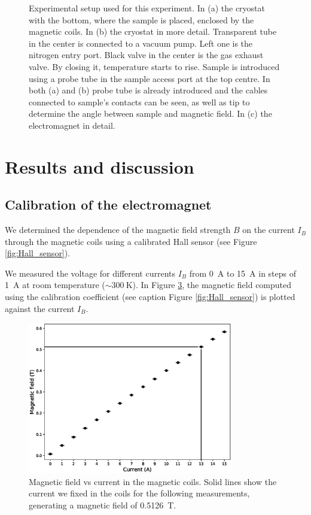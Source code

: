 \documentclass[11pt,a4paper]{article}
\begin{document}
\begin{figure}[H]
\begin{subfigure}[b]{0.6\textwidth}
\caption{}
\label{fig:electromagnet}
\end{subfigure}
\caption{Experimental setup used for this experiment. In (a) the cryostat with the bottom, where the sample is placed, enclosed by the magnetic coils. In (b) the cryostat in more detail. Transparent tube in the center is connected to a vacuum pump. Left one is the nitrogen entry port. Black valve in the center is the gas exhaust valve. By closing it, temperature starts to rise. Sample is introduced using a probe tube in the sample access port at the top centre. In both (a) and (b) probe tube is already introduced and the cables connected to sample's contacts can be seen, as well as tip to determine the angle between sample and magnetic field. In (c) the electromagnet in detail.}
\label{fig:experimental_setup_all}
\end{figure}



\section{Results and discussion}

\subsection{Calibration of the electromagnet}

We determined the dependence of the magnetic field strength $B$ on the current $I_B$ through the magnetic coils using a calibrated Hall sensor (see Figure \ref{fig:Hall_sensor}).

We measured the voltage for different currents $I_B$ from \SI{0}{\ampere} to \SI{15}{\ampere} in steps of \SI{1}{\ampere} at room temperature ($\sim\SI{300}{\kelvin}$). In Figure \ref{fig:magnetic_field}, the magnetic field computed using the calibration coefficient (see caption Figure \ref{fig:Hall_sensor}) is plotted against the current $I_B$.

\begin{figure}[H]
\centering
\includegraphics[width=0.8\textwidth]{Magnetic_field_vs_current.eps}
\caption{Magnetic field vs current in the magnetic coils. Solid lines show the current we fixed in the coils for the following measurements, generating a magnetic field of \SI{0.5126}{\tesla}.}
\label{fig:magnetic_field}
\end{figure}
\end{document}

